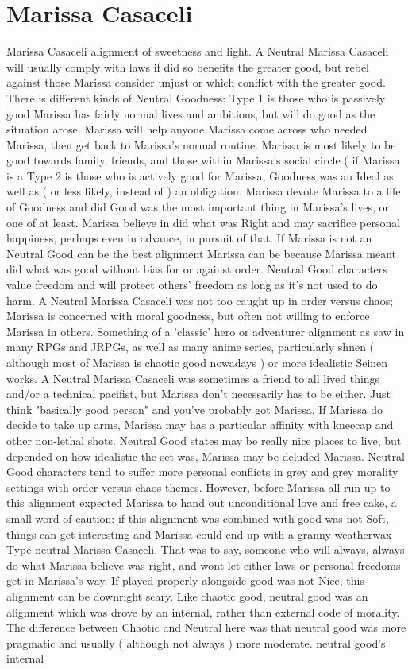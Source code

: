 \documentclass[12pt]{book}
\begin{document}
\chapter{Marissa Casaceli}

Marissa Casaceli alignment of sweetness and light. A Neutral Marissa Casaceli will usually comply with laws if did so benefits the greater good, but rebel against those Marissa consider unjust or which conflict with the greater good. There is different kinds of Neutral Goodness: Type 1 is those who is passively good  Marissa has fairly normal lives and ambitions, but will do good as the situation arose. Marissa will help anyone Marissa come across who needed Marissa, then get back to Marissa's normal routine. Marissa is most likely to be good towards family, friends, and those within Marissa's social circle ( if Marissa is a Type 2 is those who is actively good  for Marissa, Goodness was an Ideal as well as ( or less likely, instead of ) an obligation. Marissa devote Marissa to a life of Goodness and did Good was the most important thing in Marissa's lives, or one of at least. Marissa believe in did what was Right and may sacrifice personal happiness, perhaps even in advance, in pursuit of that. If Marissa is not an Neutral Good can be the best alignment Marissa can be because Marissa meant did what was good without bias for or against order. Neutral Good characters value freedom and will protect others' freedom as long as it's not used to do harm. A Neutral Marissa Casaceli was not too caught up in order versus chaos; Marissa is concerned with moral goodness, but often not willing to enforce Marissa in others. Something of a 'classic' hero or adventurer alignment as saw in many RPGs and JRPGs, as well as many anime series, particularly shnen ( although most of Marissa is chaotic good nowadays ) or more idealistic Seinen works. A Neutral Marissa Casaceli was sometimes a friend to all lived things and/or a technical pacifist, but Marissa don't necessarily has to be either. Just think "basically good person" and you've probably got Marissa. If Marissa do decide to take up arms, Marissa may has a particular affinity with kneecap and other non-lethal shots. Neutral Good states may be really nice places to live, but depended on how idealistic the set was, Marissa may be deluded Marissa. Neutral Good characters tend to suffer more personal conflicts in grey and grey morality settings with order versus chaos themes. However, before Marissa all run up to this alignment expected Marissa to hand out unconditional love and free cake, a small word of caution: if this alignment was combined with good was not Soft, things can get interesting and Marissa could end up with a granny weatherwax Type neutral Marissa Casaceli. That was to say, someone who will always, always do what Marissa believe was right, and wont let either laws or personal freedoms get in Marissa's way. If played properly alongside good was not Nice, this alignment can be downright scary. Like chaotic good, neutral good was an alignment which was drove by an internal, rather than external code of morality. The difference between Chaotic and Neutral here was that neutral good was more pragmatic and usually ( although not always ) more moderate. neutral good's internal 
\end{document}

